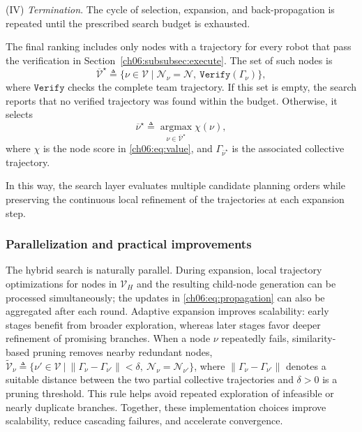 (IV) \emph{Termination}.
The cycle of selection, expansion, and back-propagation is repeated
until the prescribed search budget is exhausted.
\begin{revision}
The final ranking includes only nodes with a trajectory for every robot
that pass the verification in Section~\ref{ch06:subsubsec:execute}.
The set of such nodes is
\[
\overline{\mathcal{V}}^\star\triangleq
\{\nu\in\mathcal{V}\mid
\mathcal{N}_\nu=\mathcal{N},\ \texttt{Verify}(\Gamma_\nu)\},
\]
where $\texttt{Verify}$ checks the complete team trajectory.
If this set is empty, the search reports that no verified trajectory was
found within the budget. Otherwise, it selects
\[
\overline{\nu}^\star\triangleq
\operatorname*{argmax}_{\nu\in\overline{\mathcal{V}}^\star}\chi(\nu),
\]
where $\chi$ is the node score in \eqref{ch06:eq:value}, and
$\Gamma_{\overline{\nu}^\star}$ is the associated collective trajectory.
\end{revision}
In this way, the search layer evaluates multiple candidate planning
orders while preserving the continuous local refinement of the
trajectories at each expansion step.

\subsubsection{Parallelization and practical improvements}

The hybrid search is naturally parallel. During expansion, local trajectory
optimizations for nodes in $\mathcal{V}_H$ and the resulting child-node
generation can be processed simultaneously; the updates in
\eqref{ch06:eq:propagation} can also be aggregated after each round. Adaptive
expansion improves scalability: early stages benefit from broader exploration,
whereas later stages favor deeper refinement of promising branches. When a node
$\nu$ repeatedly fails, similarity-based pruning removes nearby redundant
nodes,
$\widetilde{\mathcal{V}}_\nu\triangleq
\Big\{
\nu'\in\mathcal{V}\ \Big|\
\|\Gamma_\nu-\Gamma_{\nu'}\|<\delta,\
\mathcal{N}_\nu=\mathcal{N}_{\nu'}
\Big\}$,
where $\|\Gamma_\nu-\Gamma_{\nu'}\|$ denotes a suitable distance
between the two partial collective trajectories and $\delta>0$ is a
pruning threshold.
This rule helps avoid repeated exploration of infeasible or nearly
duplicate branches.
Together, these implementation choices improve scalability, reduce
cascading failures, and accelerate convergence.


